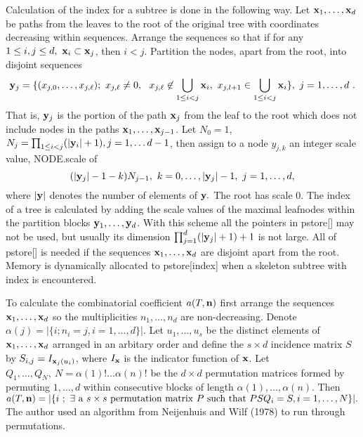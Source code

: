Calculation of the index for a subtree is done in the following way.
Let ${\bf x}_1, \ldots ,{\bf x}_d$ be paths from the leaves to the root of the
original tree with coordinates decreasing within sequences. 
Arrange the sequences so that if for any
$1 \leq i,j \leq d,~{\bf x}_i \subset {\bf x}_j$, then $i < j$. Partition the 
nodes, apart from the root, into disjoint sequences
$${\bf y}_j = \{(x_{j,0}, \ldots ,x_{j, \ell});
~x_{j,\ell } \not = 0,~~x_{j, \ell} \not\in \bigcup_{1 \leq i < j}{\bf x}_i,
~x_{j,l+1} \in \bigcup_{1 \leq i < j}{\bf x}_i\},~j = 1,\ldots ,d~.$$
That is, ${\bf y}_j$ is the portion of the path ${\bf  x}_j$
from the leaf to the root which does not include nodes in the paths
${\bf x}_1, \ldots ,{\bf x}_{j - 1}$. Let $N_0 = 1$, $N_j = \prod_{1 \leq i < j}
(|{\bf  y}_i| + 1), j = 1, \ldots d - 1$, then assign to a node $y_{j,k}$ an
integer scale value, {\sf NODE.scale} of 
$$(|{\bf  y}_j| - 1 - k)N_{j-1},~k = 0, \ldots ,|{\bf y}_j| - 1,
~j = 1, \ldots , d,$$ 
where $|{\bf  y}|$ denotes the number of elements of ${\bf  y}.$ 
The root has scale $0$.
The index of a tree is calculated by adding the scale values of the maximal
leafnodes within the partition blocks ${\bf y}_1, \ldots , {\bf y}_d$.
With this scheme
all the pointers in {\sf pstore[]} may not be used, but usually its
dimension $\prod_{j = 1}^d(|{\bf y}_j| + 1) + 1$ is not large. 
All of {\sf pstore[]}
is needed if the sequences ${\bf x}_1, \ldots ,{\bf x}_d$  are disjoint apart
from the root.
Memory is dynamically allocated
to {\sf pstore[index]} when a skeleton subtree with {\sf index} is encountered.

    To calculate the combinatorial coefficient $a(T,{\bf  n})$
first arrange the sequences ${\bf x}_1, \ldots ,{\bf x}_d$ 
so the multiplicities 
$n_1, \ldots ,n_d$ are non-decreasing. Denote $\alpha (j) = 
|\{i;n_i = j, i = 1, \ldots ,d\}|.$ Let $u_1, \ldots ,u_s$ be the distinct
elements of ${\bf x}_1, \ldots ,{\bf x}_d$ arranged in an arbitary order and
define the $s\times d$ incidence matrix $S$ by $S_{i,j} = I_{{\bf x}_j(u_i)}$,
where $I_{\bf  x}$ is the indicator function of ${\bf  x}$.
Let $Q_1, \ldots ,Q_N ,~N = \alpha (1)! \ldots \alpha (n)!$ be the
$d\times d$ permutation matrices formed by permuting $1, \ldots ,d$ within
consecutive blocks of length $\alpha (1), \ldots ,\alpha (n)$.
Then
$a(T,{\bf  n}) = |\{i~;~\exists{\rm ~a}~s\times s~{\rm permutation~matrix~}P
~{\rm such~that}~PSQ_i = S, i = 1, \ldots , N\}|.$
The author
used an algorithm from Neijenhuis and Wilf (1978) to run through permutations.


